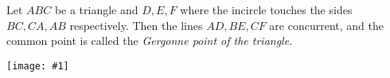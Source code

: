 \documentclass{article}
\newcommand{\figura}[1]{\begin{center}\texttt{[image: \#1]}\end{center}}
\begin{document}
Let $ABC$ be a triangle and $D,E,F$ where the incircle touches the sides $BC,CA,AB$ respectively. Then the lines $AD, BE, CF$ are concurrent, and the common point is called the \emph{Gergonne point of the triangle}.
\figura{gergonne}
\end{document}
